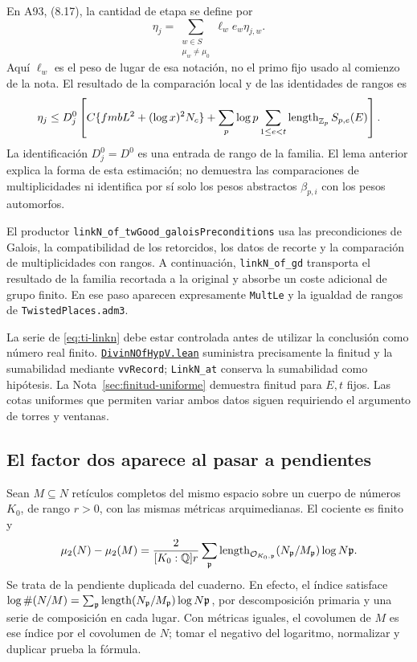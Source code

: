 En A93, (8.17), la cantidad de etapa se define por
\begin{equation}
 \eta_j=\sum_{\substack{w\in S\\\mu_w\ne\mu_0}}
             \ell_w e_w\eta_{j,w}.
 \label{eq:ti-eta}
\end{equation}
Aquí $\ell_w$ es el peso de lugar de esa notación, no el
primo fijo usado al comienzo de la nota.
El resultado de la comparación local y de las identidades de
rangos es
\begin{equation}
 \eta_j\le D_j^0\left[
 C\{fmbL^2+(\log x)^2N_c\}
 +\sum_p\log p\sum_{1\le e<t}\operatorname{length}_{\mathbb{Z}_p}S_{p,e}(E)
 \right].
 \label{eq:ti-linkn}
\end{equation}
La identificación $D_j^0=D^0$ es una entrada de rango de la
familia. El lema anterior explica la forma de esta estimación;
no demuestra las comparaciones de multiplicidades ni identifica
por sí solo los pesos abstractos $\beta_{p,i}$ con los pesos
automorfos.

El productor \texttt{linkN\_of\_twGood\_galoisPreconditions}
usa las precondiciones de Galois, la compatibilidad de los
retorcidos, los datos de recorte y la comparación de
multiplicidades con rangos. A continuación,
\texttt{linkN\_of\_gd} transporta el resultado de la familia
recortada a la original y absorbe un coste adicional de grupo
finito. En ese paso aparecen expresamente
\texttt{MultLe} y la igualdad de rangos de
\texttt{TwistedPlaces.adm3}.

La serie de \eqref{eq:ti-linkn} debe estar controlada antes
de utilizar la conclusión como número real finito.
\href{https://github.com/CocoSgt/riemann-hypothesis-lean/blob/7cbf7a0c32fca1badf05931879a37c3f8a2b03b4/src/Development/AutomorphicArithmetic/CharacterBoxes/DivinNOfHypV.lean}{\nolinkurl{DivinNOfHypV.lean}} suministra precisamente la finitud
y la sumabilidad mediante \texttt{vvRecord};
\texttt{LinkN\_at} conserva la sumabilidad como hipótesis.
La Nota~\ref{sec:finitud-uniforme} demuestra finitud para
$E,t$ fijos. Las cotas uniformes que permiten variar ambos
datos siguen requiriendo el argumento de torres y ventanas.

\subsection{El factor dos aparece al pasar a pendientes}

Sean $M\subseteq N$ retículos completos del mismo espacio sobre
un cuerpo de números $K_0$, de rango $r>0$, con las mismas
métricas arquimedianas. El cociente es finito y
\begin{equation}
 \mu_2(N)-\mu_2(M)
 =\frac{2}{[K_0:\mathbb{Q}]r}
      \sum_{\mathfrak p}
       \operatorname{length}_{\mathcal O_{K_0,\mathfrak p}}(N_{\mathfrak p}/M_{\mathfrak p})
                      \log N\mathfrak p.
 \label{eq:ti-grado}
\end{equation}
Se trata de la pendiente duplicada del cuaderno.
En efecto, el índice satisface
$\log\#(N/M)=\sum_{\mathfrak p}\operatorname{length}(N_{\mathfrak p}/M_{\mathfrak p})
\log N\mathfrak p$, por descomposición primaria y una
serie de composición en cada lugar. Con métricas iguales,
el covolumen de $M$ es ese índice por el covolumen de $N$;
tomar el negativo del logaritmo, normalizar y duplicar prueba
la fórmula.

